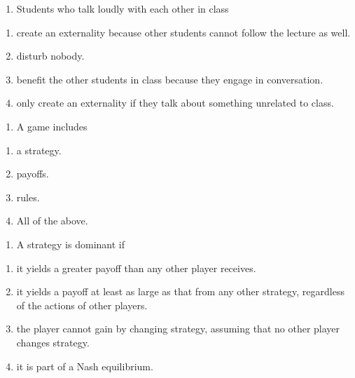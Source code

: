 \documentclass[11pt,]{article}
\providecommand{\tightlist}{%
  \setlength{\itemsep}{0pt}\setlength{\parskip}{0pt}}
\begin{document}
\begin{enumerate}
\def\labelenumi{\arabic{enumi})}
\setcounter{enumi}{14}
\tightlist
\item
  Students who talk loudly with each other in class
\end{enumerate}

\begin{enumerate}
\def\labelenumi{\Alph{enumi})}
\tightlist
\item
  create an externality because other students cannot follow the lecture
  as well.
\item
  disturb nobody.
\item
  benefit the other students in class because they engage in
  conversation.
\item
  only create an externality if they talk about something unrelated to
  class.
\end{enumerate}

\begin{enumerate}
\def\labelenumi{\arabic{enumi})}
\setcounter{enumi}{15}
\tightlist
\item
  A game includes
\end{enumerate}

\begin{enumerate}
\def\labelenumi{\Alph{enumi})}
\tightlist
\item
  a strategy.
\item
  payoffs.
\item
  rules.
\item
  All of the above.
\end{enumerate}

\begin{enumerate}
\def\labelenumi{\arabic{enumi})}
\setcounter{enumi}{16}
\tightlist
\item
  A strategy is dominant if
\end{enumerate}

\begin{enumerate}
\def\labelenumi{\Alph{enumi})}
\tightlist
\item
  it yields a greater payoff than any other player receives.
\item
  it yields a payoff at least as large as that from any other strategy,
  regardless of the actions of other players.
\item
  the player cannot gain by changing strategy, assuming that no other
  player changes strategy.
\item
  it is part of a Nash equilibrium.
\end{enumerate}
\end{document}
